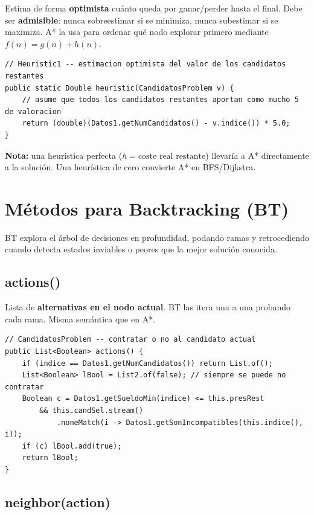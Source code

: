 \documentclass[12pt, a4paper]{article}
\begin{document}
Estima de forma \textbf{optimista} cuánto queda por ganar/perder hasta el final. Debe ser \textbf{admisible}: nunca sobreestimar si se minimiza, nunca subestimar si se maximiza. A* la usa para ordenar qué nodo explorar primero mediante $f(n) = g(n) + h(n)$.

\begin{lstlisting}[style=java]
// Heuristic1 -- estimacion optimista del valor de los candidatos restantes
public static Double heuristic(CandidatosProblem v) {
    // asume que todos los candidatos restantes aportan como mucho 5 de valoracion
    return (double)(Datos1.getNumCandidatos() - v.indice()) * 5.0;
}
\end{lstlisting}

\textbf{Nota:} una heurística perfecta ($h = \text{coste real restante}$) llevaría a A* directamente a la solución. Una heurística de cero convierte A* en BFS/Dijkstra.

\section{Métodos para Backtracking (BT)}

BT explora el árbol de decisiones en profundidad, podando ramas y retrocediendo cuando detecta estados inviables o peores que la mejor solución conocida.

\subsection{actions()}

Lista de \textbf{alternativas en el nodo actual}. BT las itera una a una probando cada rama. Misma semántica que en A*.

\begin{lstlisting}[style=java]
// CandidatosProblem -- contratar o no al candidato actual
public List<Boolean> actions() {
    if (indice == Datos1.getNumCandidatos()) return List.of();
    List<Boolean> lBool = List2.of(false); // siempre se puede no contratar
    Boolean c = Datos1.getSueldoMin(indice) <= this.presRest
        && this.candSel.stream()
            .noneMatch(i -> Datos1.getSonIncompatibles(this.indice(), i));
    if (c) lBool.add(true);
    return lBool;
}
\end{lstlisting}

\subsection{neighbor(action)}
\end{document}

